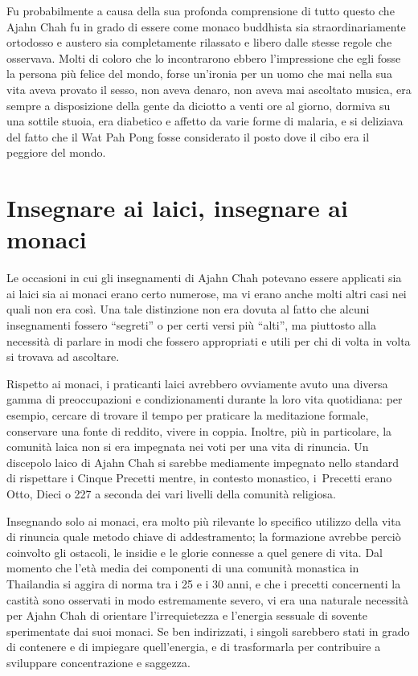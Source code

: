 Fu probabilmente a causa della sua profonda comprensione di tutto questo
che Ajahn Chah fu in grado di essere come monaco buddhista sia
straordinariamente ortodosso e austero sia completamente rilassato e
libero dalle stesse regole che osservava. Molti di coloro che lo
incontrarono ebbero l'impressione che egli fosse la persona più felice
del mondo, forse un'ironia per un uomo che mai nella sua vita aveva
provato il sesso, non aveva denaro, non aveva mai ascoltato musica, era
sempre a disposizione della gente da diciotto a venti ore al giorno,
dormiva su una sottile stuoia, era diabetico e affetto da varie forme di
malaria, e si deliziava del fatto che il Wat Pah Pong fosse considerato
il posto dove il cibo era il peggiore del mondo.

\section{Insegnare ai laici, insegnare ai monaci}

Le occasioni in cui gli insegnamenti di Ajahn Chah potevano essere
applicati sia ai laici sia ai monaci erano certo numerose, ma vi erano
anche molti altri casi nei quali non era così. Una tale distinzione non
era dovuta al fatto che alcuni insegnamenti fossero ``segreti'' o per
certi versi più ``alti'', ma piuttosto alla necessità di parlare in modi
che fossero appropriati e utili per chi di volta in volta si trovava ad
ascoltare.

Rispetto ai monaci, i praticanti laici avrebbero ovviamente avuto una
diversa gamma di preoccupazioni e condizionamenti durante la loro vita
quotidiana: per esempio, cercare di trovare il tempo per praticare la
meditazione formale, conservare una fonte di reddito, vivere in coppia.
Inoltre, più in particolare, la comunità laica non si era impegnata nei
voti per una vita di rinuncia. Un discepolo laico di Ajahn Chah si
sarebbe mediamente impegnato nello \mbox{standard} di rispettare i Cinque
Precetti mentre, in contesto monastico, i~Precetti erano Otto, Dieci o
227 a seconda dei vari livelli della comunità religiosa.

Insegnando solo ai monaci, era molto più rilevante lo specifico utilizzo
della vita di rinuncia quale metodo chiave di addestramento; la
formazione avrebbe perciò coinvolto gli ostacoli, le insidie e le glorie
connesse a quel genere di vita. Dal momento che l'età media dei
componenti di una comunità monastica in Thailandia si aggira di norma
tra i 25 e i 30 anni, e che i precetti concernenti la castità sono
osservati in modo estremamente severo, vi era una naturale necessità per
Ajahn Chah di orientare l'irrequietezza e l'energia sessuale di sovente
sperimentate dai suoi monaci. Se ben indirizzati, i singoli sarebbero
stati in grado di contenere e di impiegare quell'energia, e di
trasformarla per contribuire a sviluppare concentrazione e saggezza.

